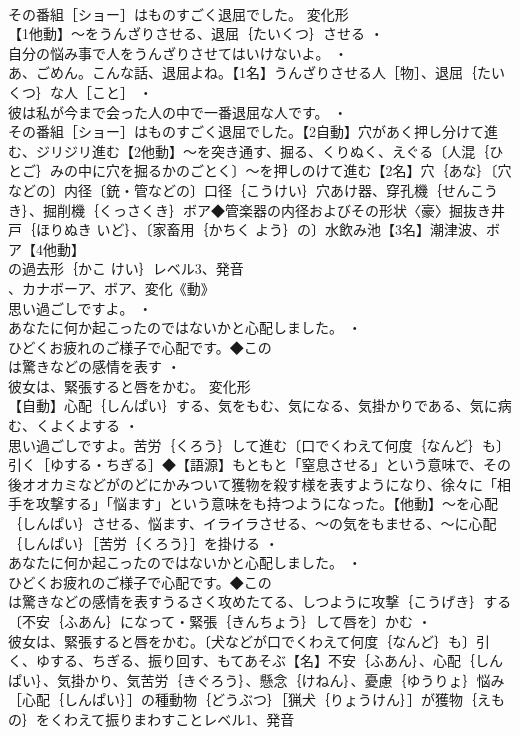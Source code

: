 \documentclass[8pt]{extreport}
\begin{document}
\begin{CJK}{UTF8}{min}
\\	その番組［ショー］はものすごく退屈でした。	変化形 
\\	【1他動】～をうんざりさせる、退屈｛たいくつ｝させる ・
\\	自分の悩み事で人をうんざりさせてはいけないよ。 ・
\\	あ、ごめん。こんな話、退屈よね。【1名】うんざりさせる人［物］、退屈｛たいくつ｝な人［こと］ ・
\\	彼は私が今まで会った人の中で一番退屈な人です。 ・
\\	その番組［ショー］はものすごく退屈でした。【2自動】穴があく押し分けて進む、ジリジリ進む【2他動】～を突き通す、掘る、くりぬく、えぐる〔人混｛ひとご｝みの中に穴を掘るかのごとく〕～を押しのけて進む【2名】穴｛あな｝〔穴などの〕内径〔銃・管などの〕口径｛こうけい｝穴あけ器、穿孔機｛せんこうき｝、掘削機｛くっさくき｝ボア◆管楽器の内径およびその形状〈豪〉掘抜き井戸｛ほりぬき いど｝、〔家畜用｛かちく よう｝の〕水飲み池【3名】潮津波、ボア【4他動】
\\	の過去形｛かこ けい｝レベル3、発音
\\	、カナボーア、ボア、変化《動》
\\	思い過ごしですよ。 ・
\\	あなたに何か起こったのではないかと心配しました。 ・
\\	ひどくお疲れのご様子で心配です。◆この
\\	は驚きなどの感情を表す ・
\\	彼女は、緊張すると唇をかむ。	変化形 
\\	【自動】心配｛しんぱい｝する、気をもむ、気になる、気掛かりである、気に病む、くよくよする ・
\\	思い過ごしですよ。苦労｛くろう｝して進む〔口でくわえて何度｛なんど｝も〕引く［ゆする・ちぎる］◆【語源】もともと「窒息させる」という意味で、その後オオカミなどがのどにかみついて獲物を殺す様を表すようになり、徐々に「相手を攻撃する」「悩ます」という意味をも持つようになった。【他動】～を心配｛しんぱい｝させる、悩ます、イライラさせる、～の気をもませる、～に心配｛しんぱい｝［苦労｛くろう｝］を掛ける ・
\\	あなたに何か起こったのではないかと心配しました。 ・
\\	ひどくお疲れのご様子で心配です。◆この
\\	は驚きなどの感情を表すうるさく攻めたてる、しつように攻撃｛こうげき｝する〔不安｛ふあん｝になって・緊張｛きんちょう｝して唇を〕かむ ・
\\	彼女は、緊張すると唇をかむ。〔犬などが口でくわえて何度｛なんど｝も〕引く、ゆする、ちぎる、振り回す、もてあそぶ【名】不安｛ふあん｝、心配｛しんぱい｝、気掛かり、気苦労｛きぐろう｝、懸念｛けねん｝、憂慮｛ゆうりょ｝悩み［心配｛しんぱい｝］の種動物｛どうぶつ｝［猟犬｛りょうけん｝］が獲物｛えもの｝をくわえて振りまわすことレベル1、発音

\end{CJK}
\end{document}
